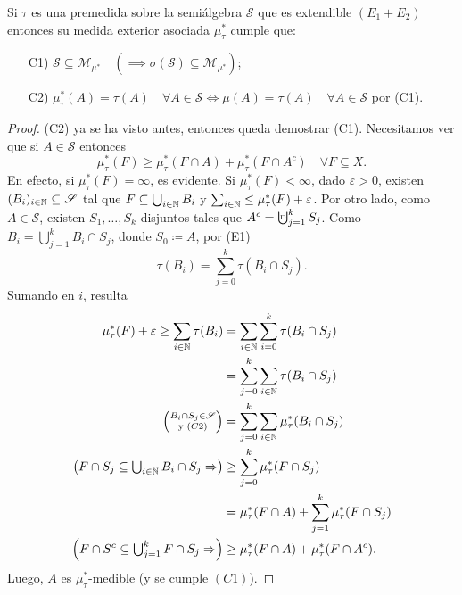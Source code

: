 \begin{prop}
	Si $\tau$ es una premedida sobre la semiálgebra $\mathscr{S}$ que es extendible $(E_1 + E_2)$ entonces su medida exterior asociada $\mu^{*}_{\tau}$ cumple que:
	\begin{enumerate}
		\item[C1)] $\mathscr{S} \subseteq \mathscr{M}_{\mu^*} \quad (\implies \sigma(\mathscr{S}) \subseteq \mathscr{M}_{\mu^{*}})$;

		\item[C2)] $\mu^{*}_{\tau}(A) = \tau(A) \quad \forall A \in \mathscr{S} \iff \mu(A) = \tau(A) \quad \forall A \in \mathscr{S}$ por (C1).
	\end{enumerate}
\end{prop}
\begin{proof}
	(C2) ya se ha visto antes, entonces queda demostrar (C1). Necesitamos ver que si $A \in \mathscr{S}$ entonces
	\[ \mu^{*}_{\tau}(F) \geq \mu^{*}_{\tau}(F \cap A) + \mu^{*}_{\tau}(F \cap A^c) \quad \forall F \subseteq X. \]
	En efecto, si $\mu^{*}_{\tau}(F) = \infty$, es evidente. Si $\mu^{*}_{\tau}(F) < \infty$, dado $\varepsilon > 0$, existen $(B_i)_{i\in\mathbb{N}} \subseteq \mathscr{S}$ tal que $F \subseteq \bigcup_{i\in\mathbb{N}} B_i$ y $\sum_{i\in\mathbb{N}} \leq \mu^{*}_{\tau}(F) + \varepsilon$. Por otro lado, como $A \in \mathscr{S}$, existen $S_{1},\dots,S_{k}$ disjuntos tales que $A^c = \textbigcupd_{j=1}^{k} S_j$. Como $B_i = \bigcup_{j=1}^{k} B_i \cap S_j$, donde $S_0 \coloneq A$, por (E1)
	\[ \tau(B_i) = \sum_{j=0}^{k} \tau(B_i \cap S_j). \]
	Sumando en $i$, resulta
	\begin{align*}
		\mu^{*}_{\tau}(F) + \varepsilon \geq \sum_{i\in\mathbb{N}} \tau(B_i) &= \sum_{i\in\mathbb{N}}\sum_{i=0}^{k} \tau(B_i \cap S_j) \\
		&= \sum_{j=0}^{k} \sum_{i\in\mathbb{N}}\tau(B_i \cap S_j) \\
		\left(\substack{B_i \cap S_j \in \mathscr{S} \\
					\text{y } (C2)}\right) &= \sum_{j=0}^{k} \sum_{i\in\mathbb{N}} \mu^{*}_{\tau}(B_i \cap S_j) \\
		\left(F \cap S_j \subseteq \textstyle\bigcup_{i\in\mathbb{N}} B_i \cap S_j \Rightarrow\right) & \geq \sum_{j=0}^{k} \mu^{*}_{\tau}(F \cap S_j) \\
		&= \mu^{*}_{\tau}(F \cap A) + \sum_{j=1}^{k} \mu^{*}_{\tau}(F \cap S_j) \\
		\left(F \cap S^c \subseteq \textstyle\bigcup_{j=1}^{k} F \cap S_j \Rightarrow \right) & \geq \mu^{*}_{\tau}(F \cap A) + \mu^{*}_{\tau}(F \cap A^c)
	.\end{align*}
	Luego, $A$ es $\mu^{*}_{\tau}$-medible (y se cumple $(C1)$).
\end{proof}

